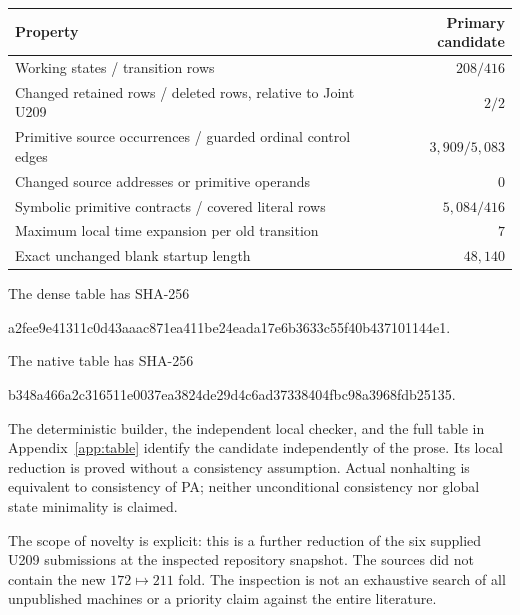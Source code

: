 \begin{center}
\begin{tabular}{@{}lr@{}}
\toprule
Property & Primary candidate\\
\midrule
Working states / transition rows & $208/416$\\
Changed retained rows / deleted rows, relative to Joint U209 & $2/2$\\
Primitive source occurrences / guarded ordinal control edges & $3,909/5,083$\\
Changed source addresses or primitive operands & $0$\\
Symbolic primitive contracts / covered literal rows & $5,084/416$\\
Maximum local time expansion per old transition & $7$\\
Exact unchanged blank startup length & $48,140$\\
\bottomrule
\end{tabular}
\end{center}

The dense table has SHA-256
\begin{center}\small\ttfamily
a2fee9e41311c0d43aaac871ea411be24eada17e6b3633c55f40b437101144e1.
\end{center}
The native table has SHA-256
\begin{center}\small\ttfamily
b348a466a2c316511e0037ea3824de29d4c6ad37338404fbc98a3968fdb25135.
\end{center}
The deterministic builder, the independent local checker, and the full
table in Appendix~\ref{app:table} identify the candidate independently of
the prose. Its local reduction is proved without a consistency
assumption. Actual nonhalting is equivalent to consistency of PA;
neither unconditional consistency nor global state minimality is claimed.

The scope of novelty is explicit: this is a further reduction of the
six supplied U209 submissions at the inspected repository snapshot.
The sources did not contain the new $172\mapsto211$ fold. The inspection
is not an exhaustive search of all unpublished machines or a priority
claim against the entire literature.
